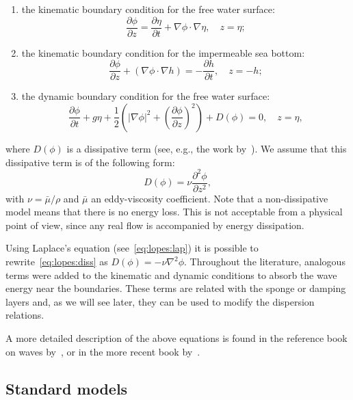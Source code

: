 \begin{enumerate}
\item the kinematic boundary condition for the free water
  surface:
  \begin{equation}
    \frac{\partial \phi}{\partial
      z}=\frac{\partial\eta}{\partial
      t}+\nabla\phi\cdot\nabla\eta,\quad z=\eta;
  \end{equation}
\item the kinematic boundary condition for the
  impermeable sea bottom:
  \begin{equation}
    \frac{\partial \phi}{\partial z}+(\nabla\phi\cdot\nabla
    h)=-\frac{\partial h}{\partial t}, \quad z=-h;
  \end{equation}
\item the dynamic boundary condition for the
  free water surface:
  \begin{equation}\label{eq:lopes:dyn}
    \frac{\partial \phi}{\partial t}+ g\eta+\frac{1}{2}
    \left(|\nabla\phi|^2 + \left(\frac{\partial \phi}{\partial
          z}\right)^2\right)+ D(\phi) = 0, \quad z =\eta,
  \end{equation}
\end{enumerate}
where $D(\phi)$ is a dissipative term (see, e.g., the work
by~\citet{DutykhDias2007}).  We assume that this dissipative term is
of the following form:
\begin{equation}
  \label{eq:lopes:diss}
  D(\phi)=\nu\frac{\partial ^2\phi}{\partial z^2},
\end{equation}
with $\nu=\bar{\mu}/\rho$ and $\bar{\mu}$ an eddy-viscosity
coefficient.  Note that a non-dissipative model means that there is no
energy loss.  This is not acceptable from a physical point of view,
since any real flow is accompanied by energy dissipation.

Using Laplace's equation (see~\eqref{eq:lopes:lap}) it is possible to
rewrite~\eqref{eq:lopes:diss} as $D(\phi)=-\nu\nabla^2\phi$.
Throughout the literature, analogous terms were added to the kinematic
and dynamic conditions to absorb the wave energy near the boundaries.
These terms are related with the sponge or damping layers and, as we
will see later, they can be used to modify the dispersion relations.

A more detailed description of the above equations is found in the
reference book on waves by~\citet{Whitham1974}, or in the more recent
book by~\citet{Johnson1997}.

\subsection{Standard models}

